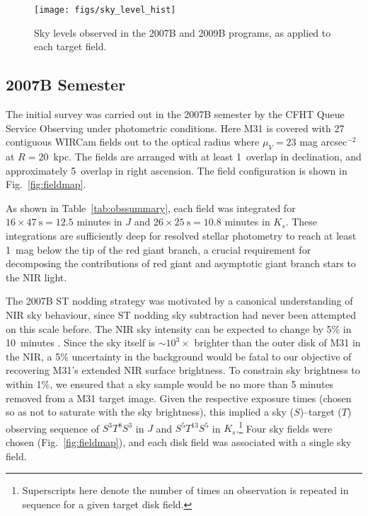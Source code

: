 \documentclass[iop]{emulateapj}
\newcommand{\Fig}[1]{Fig.~\ref{fig:#1}}  %
\begin{document}
\begin{figure}[t]
\centering
\texttt{[image: figs/sky\_level\_hist]}
\caption{Sky levels observed in the 2007B and 2009B programs, as applied to each target field.}
\label{fig:net_sky_level}
\end{figure}

\subsection{2007B Semester}
\label{sec:obs7}

The initial survey was carried out in the 2007B semester by the CFHT Queue Service Observing under photometric conditions.
Here M31 is covered with 27 contiguous WIRCam fields out to the optical radius where $\mu_V=23$ mag arcsec$^{-2}$ at $R=20$~kpc.
The fields are arranged with at least 1\arcmin\ overlap in declination, and approximately 5\arcmin\ overlap in right ascension.
The field configuration is shown in \Fig{fieldmap}.

As shown in Table~\ref{tab:obssummary}, each field was integrated for $16\times 47~\mathrm{s} = 12.5$ minutes in $J$ and $26\times 25~\mathrm{s} = 10.8$ minutes in $K_s$.
These integrations are sufficiently deep for resolved stellar photometry to reach at least 1~mag below the tip of the red giant branch, a crucial requirement for decomposing the contributions of red giant and asymptotic giant branch stars to the NIR light.

The 2007B ST nodding strategy was motivated by a canonical understanding of NIR sky behaviour, since ST nodding sky subtraction had never been attempted on this scale before.
The NIR sky intensity can be expected to change by 5\% in 10~minutes \citep{Adams:1996,Vaduvescu:2004}.
Since the sky itself is $\sim10^3\times$ brighter than the outer disk of M31 in the NIR, a 5\% uncertainty in the background would be fatal to our objective of recovering M31's extended NIR surface brightness.
To constrain sky brightness to within 1\%, we ensured that a sky sample would be no more than 5 minutes removed from a M31 target image.
Given the respective exposure times (chosen so as not to saturate with the sky brightness), this implied a sky ($S$)--target ($T$) observing sequence of $S^3T^8S^3$ in $J$ and $S^5T^{13}S^5$ in $K_s$.\footnote{Superscripts here denote the number of times an observation is repeated in sequence for a given target disk field.}
Four sky fields were chosen (\Fig{fieldmap}), and each disk field was associated with a single sky field.
\end{document}
